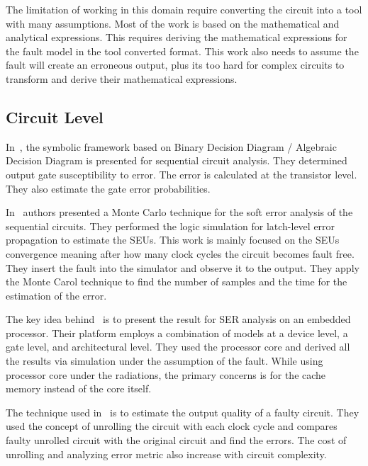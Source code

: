 The limitation of working in this domain require converting the circuit into a tool with many assumptions. Most of the work is based on the mathematical and analytical expressions. This requires deriving the mathematical expressions for the fault model in the tool converted format. This work also needs to assume the fault will create an erroneous output, plus its too hard for complex circuits to transform and derive their mathematical expressions.


\subsection{Circuit Level}




In~\citep{miskov2007mars}, the symbolic framework based on Binary Decision Diagram / Algebraic Decision
Diagram is presented for sequential circuit analysis. They determined output gate susceptibility to error. The error is calculated at the transistor level. They also estimate the gate error probabilities.


In~\citep{li2016monte} authors presented a  Monte Carlo technique for the soft error analysis of the sequential
circuits. They performed the logic simulation for latch-level error propagation to estimate the SEUs. This work is mainly focused on the SEUs convergence meaning after how many clock cycles the circuit becomes fault free.
They insert the fault into the simulator and observe it to the output. They apply the Monte Carol technique
to find the number of samples and the time for the estimation of the error.
  
  

The key idea behind~\citep{ebrahimi2015comprehensive} is to present the result for SER analysis on an embedded
processor. Their platform employs a combination of models at a device level, a gate level, and architectural level. They used the
processor core and derived all the results via simulation under the assumption of the fault. While using processor core under the radiations, the primary concerns is for the cache memory instead
of the core itself.


The technique used in~\citep{ranjan2014aslan} is to estimate the output quality of a faulty circuit. They used the concept
of unrolling the circuit with each clock cycle and compares faulty unrolled circuit with the original circuit and find the errors.
The cost of unrolling and analyzing error metric also increase
with circuit complexity.

